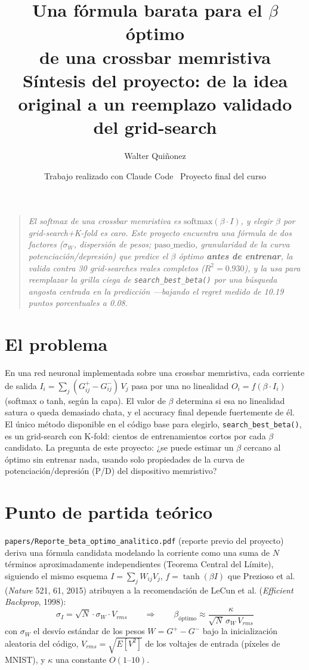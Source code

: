 \documentclass[11pt]{article}
\title{\textbf{Una fórmula barata para el $\beta$ óptimo\\ de una crossbar memristiva}\\
\large Síntesis del proyecto: de la idea original a un reemplazo validado del grid-search}
\author{Walter Quiñonez}
\date{Trabajo realizado con Claude Code \textperiodcentered\ Proyecto final del curso}
\begin{document}
\maketitle

\begin{quote}\itshape
El softmax de una crossbar memristiva es $\mathrm{softmax}(\beta\cdot I)$, y elegir $\beta$
por grid-search+K-fold es caro. Este proyecto encuentra una fórmula de dos factores
($\sigma_W$, dispersión de pesos; $\mathrm{paso\_medio}$, granularidad de la curva
potenciación/depresión) que predice el $\beta$ óptimo \textbf{antes de entrenar}, la valida
contra 30 grid-searches reales completos ($R^2=0.930$), y la usa para reemplazar la grilla
ciega de \texttt{search\_best\_beta()} por una búsqueda angosta centrada en la predicción
—bajando el \emph{regret} medido de 10.19 puntos porcentuales a 0.08.
\end{quote}

\tableofcontents

\section{El problema}

En una red neuronal implementada sobre una crossbar memristiva, cada corriente de salida
$I_i = \sum_j (G^+_{ij}-G^-_{ij})\,V_j$ pasa por una no linealidad $O_i=f(\beta\cdot I_i)$
(softmax o tanh, según la capa). El valor de $\beta$ determina si esa no linealidad satura o
queda demasiado chata, y el accuracy final depende fuertemente de él. El único método
disponible en el código base para elegirlo, \texttt{search\_best\_beta()}, es un grid-search
con K-fold: cientos de entrenamientos cortos por cada $\beta$ candidato. La pregunta de este
proyecto: ¿se puede estimar un $\beta$ cercano al óptimo sin entrenar nada, usando solo
propiedades de la curva de potenciación/depresión (P/D) del dispositivo memristivo?

\section{Punto de partida teórico}

\texttt{papers/Reporte\_beta\_optimo\_analitico.pdf} (reporte previo del proyecto) deriva una
fórmula candidata modelando la corriente como una suma de $N$ términos aproximadamente
independientes (Teorema Central del Límite), siguiendo el mismo esquema
$I=\sum_j W_{ij}V_j$, $f=\tanh(\beta I)$ que Prezioso et al. (\emph{Nature} 521, 61, 2015)
atribuyen a la recomendación de LeCun et al. (\emph{Efficient Backprop}, 1998):
$$\sigma_I = \sqrt{N}\cdot\sigma_W\cdot V_{rms} \qquad\Rightarrow\qquad
\beta_{\text{óptimo}} \approx \frac{\kappa}{\sqrt{N}\,\sigma_W\,V_{rms}}$$
con $\sigma_W$ el desvío estándar de los pesos $W=G^+-G^-$ bajo la inicialización aleatoria
del código, $V_{rms}=\sqrt{E[V^2]}$ de los voltajes de entrada (píxeles de MNIST), y $\kappa$
una constante $O(1\text{--}10)$.
\end{document}
